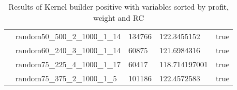 \begin{table}[!htbp]
{\begin{tabular}{@{}lllll@{}}
                & random50\_500\_2\_1000\_1\_14 & 134766 & 122.3455152 & true \\  
                & random60\_240\_3\_1000\_1\_14 & 60875 & 121.6984316 & true \\  
                & random75\_225\_4\_1000\_1\_17 & 60417 & 118.714197001 & true \\  
                & random75\_375\_2\_1000\_1\_5 & 101186 & 122.4572583 & true \\  
                \bottomrule
        \end{tabular}
        }
    \caption{Results of Kernel builder positive with variables sorted by profit, weight and RC}
    \label{tab:ker_pos_val_prof_wei_RC}
\end{table}
